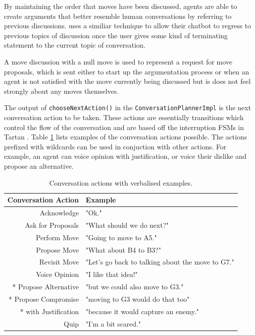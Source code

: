 \documentclass{article}
\begin{document}
By maintaining the order that moves have been discussed, agents are able to create arguments that better resemble human conversations by referring to previous discussions. \cite{tartan} uses a similiar technique to allow their chatbot to regress to previous topics of discussion once the user gives some kind of terminating statement to the current topic of conversation. 

A move discussion with a null move is used to represent a request for move proposals, which is sent either to start up the argumentation process or when an agent is not satisfied with the move currently being discussed but is does not feel strongly about any moves themselves.

The output of \lstinline{chooseNextAction()} in the \lstinline{ConversationPlannerImpl} is the next conversation action to be taken. These actions are essentially transitions which control the flow of the conversation and are based off the interruption FSMs in Tartan \cite{tartan}. Table \ref{tbl:conversationaction} lists examples of the conversation actions possible. The actions prefixed with wildcards can be used in conjuction with other actions. For example, an agent can voice opinion with justification, or voice their dislike and propose an alternative. 


\begin{table} 
\centering
\caption{Conversation actions with verbalised examples.} 
\label{tbl:conversationaction}
\begin{tabular}{ r|l } 
	Conversation Action & Example \\
 \hline
	Acknowledge & "Ok." \\ 
	Ask for Proposals & "What should we do next?" \\ 
	Perform Move & "Going to move to A5." \\ 
	Propose Move & "What about B4 to B3?" \\ 
	Revisit Move & "Let's go back to talking about the move to G7." \\ 
	Voice Opinion & "I like that idea!" \\ 
	* Propose Alternative & "but we could also move to G3." \\ 
	* Propose Compromise & "moving to G3 would do that too"  \\ 
	* with Justification & "because it would capture an enemy."  \\ 
	Quip & "I'm a bit scared."  \\ 
 \hline
\end{tabular}
\end{table}
\end{document}
